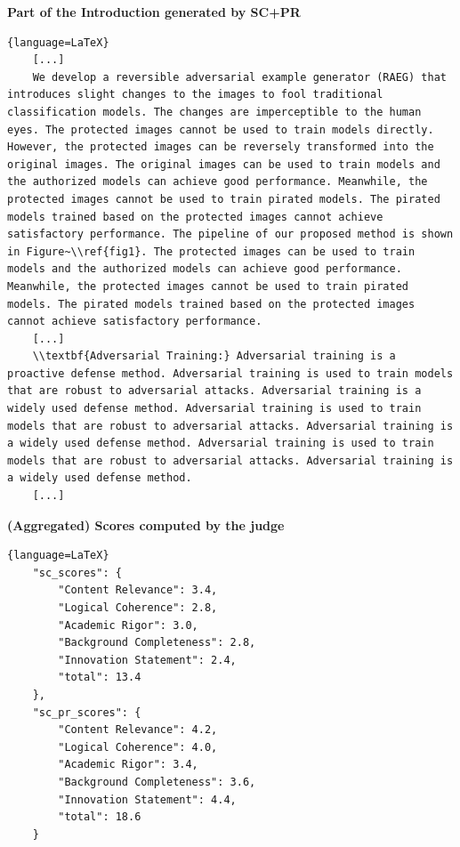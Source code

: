 \textbf{Part of the Introduction generated by SC+PR}
\begin{lstlisting}{language=LaTeX}
    [...]
    We develop a reversible adversarial example generator (RAEG) that introduces slight changes to the images to fool traditional classification models. The changes are imperceptible to the human eyes. The protected images cannot be used to train models directly. However, the protected images can be reversely transformed into the original images. The original images can be used to train models and the authorized models can achieve good performance. Meanwhile, the protected images cannot be used to train pirated models. The pirated models trained based on the protected images cannot achieve satisfactory performance. The pipeline of our proposed method is shown in Figure~\\ref{fig1}. The protected images can be used to train models and the authorized models can achieve good performance. Meanwhile, the protected images cannot be used to train pirated models. The pirated models trained based on the protected images cannot achieve satisfactory performance.
    [...]
    \\textbf{Adversarial Training:} Adversarial training is a proactive defense method. Adversarial training is used to train models that are robust to adversarial attacks. Adversarial training is a widely used defense method. Adversarial training is used to train models that are robust to adversarial attacks. Adversarial training is a widely used defense method. Adversarial training is used to train models that are robust to adversarial attacks. Adversarial training is a widely used defense method.
    [...]
\end{lstlisting}
\newpage
\textbf{(Aggregated) Scores computed by the judge}
\begin{lstlisting}{language=LaTeX}
    "sc_scores": {
        "Content Relevance": 3.4,
        "Logical Coherence": 2.8,
        "Academic Rigor": 3.0,
        "Background Completeness": 2.8,
        "Innovation Statement": 2.4,
        "total": 13.4
    },
    "sc_pr_scores": {
        "Content Relevance": 4.2,
        "Logical Coherence": 4.0,
        "Academic Rigor": 3.4,
        "Background Completeness": 3.6,
        "Innovation Statement": 4.4,
        "total": 18.6
    }
\end{lstlisting}

